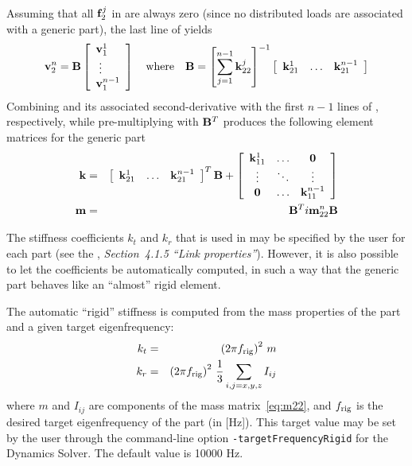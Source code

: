 Assuming that all ${\bf f}^j_2$ in 
are always zero (since no distributed loads are associated with a generic part),
the last line of  yields
%
\begin{equation}
\label{eq:generic part B-matrix}
{\bf v}^n_2 = {\bf B}
\left[\begin{array}{l}
{\bf v}^1_1 \\ \;\vdots \\ {\bf v}^{n-1}_1
\end{array}\right] \quad\text{where}\quad
{\bf B} =
\left[ \sum\limits_{j=1}^{n-1} {\bf k}^j_{22} \right]^{-1}
\left[\begin{array}{cccc}
{\bf k}^1_{21} & \hdots & {\bf k}^{n-1}_{21}
\end{array}\right]
\end{equation}
%
Combining  and its associated second-derivative
with the first $n-1$ lines of
,
respectively, while pre-multiplying with ${\bf B}^T$ produces the following
element matrices for the generic part
%
\begin{eqnarray}
{\bf k} &=&
\left[\begin{array}{cccc}
{\bf k}^1_{21} & \hdots & {\bf k}^{n-1}_{21}
\end{array}\right]^T {\bf B} +
\left[\begin{array}{ccc}
{\bf k}^1_{11} & \hdots & {\bf 0} \\
\vdots         & \ddots & \vdots  \\
{\bf 0}        & \hdots & {\bf k}^{n-1}_{11}
\end{array}\right] \\
{\bf m} &=& {\bf B}^Ti {\bf m}_{22}^n {\bf B}
\end{eqnarray}

The stiffness coefficients $k_t$ and $k_r$ that is used in
 may be specified by the user for each part
(see the \FedemUG, {\em Section~4.1.5 ``Link properties''}).
However, it is also possible to let the coefficients be automatically computed,
in such a way that the generic part behaves like an ``almost'' rigid element.

The automatic ``rigid'' stiffness is computed from the mass properties of the
part and a given target eigenfrequency:
%
\begin{eqnarray}
k_t &=& \left(2\pi f_{\rm rig}\right)^2 \,m \\
k_r &=& \left(2\pi f_{\rm rig}\right)^2 \,\frac{1}{3}\sum_{i,j = x,y,z} I_{ij}
\end{eqnarray}
%
where $m$ and $I_{ij}$ are components of the mass matrix~\eqref{eq:m22},
and $f_{\rm rig}$ is the desired target eigenfrequency of the part (in [Hz]).
This target value may be set by the user through the command-line option
{\tt -targetFrequencyRigid} for the Dynamics Solver.
The default value is 10000 Hz.
